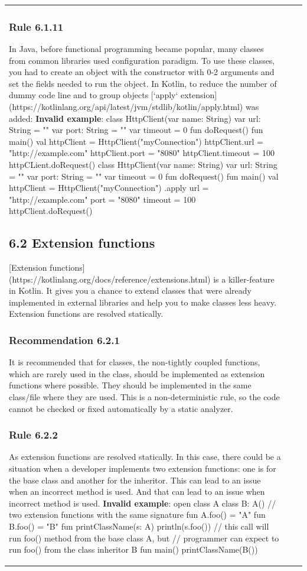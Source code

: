 \begin{center}
\begin{tabular}{ |p{}|p{}|p{}| }
{{{{{\subsubsection*{\textbf{Rule 6.1.11}}
In Java, before functional programming became popular, many classes from common libraries used configuration paradigm.
To use these classes, you had to create an object with the constructor with 0-2 arguments and set the fields needed to run the object.
In Kotlin, to reduce the number of dummy code line and to group objects [`apply` extension](https://kotlinlang.org/api/latest/jvm/stdlib/kotlin/apply.html) was added:
\textbf{Invalid example}:
class HttpClient(var name: String) {
    var url: String = ""
    var port: String = ""
    var timeout = 0
    fun doRequest() {}
}
fun main() {
    val httpClient = HttpClient("myConnection")
    httpClient.url = "http://example.com"
    httpClient.port = "8080"
    httpClient.timeout = 100
    httpCLient.doRequest()
}
class HttpClient(var name: String) {
    var url: String = ""
    var port: String = ""
    var timeout = 0
    fun doRequest() {}
}
fun main() {
    val httpClient = HttpClient("myConnection")
            .apply {
                url = "http://example.com"
                port = "8080"
                timeout = 100
            }
    httpClient.doRequest()
}
\subsection*{\textbf{6.2 Extension functions}}
[Extension functions](https://kotlinlang.org/docs/reference/extensions.html) is a killer-feature in Kotlin.
It gives you a chance to extend classes that were already implemented in external libraries and help you to make classes less heavy.
Extension functions are resolved statically.
\subsubsection*{\textbf{Recommendation 6.2.1}}
It is recommended that for classes, the non-tightly coupled functions, which are rarely used in the class, should be implemented as extension functions where possible.
They should be implemented in the same class/file where they are used. This is a non-deterministic rule, so the code cannot be checked or fixed automatically by a static analyzer.
\subsubsection*{\textbf{Rule 6.2.2}}
As extension functions are resolved statically. In this case, there could be a situation when a developer implements two extension functions: one is for the base class and another for the inheritor.
This can lead to an issue when an incorrect method is used.
And that can lead to an issue when incorrect method is used.
\textbf{Invalid example}:
open class A
class B: A()
// two extension functions with the same signature
fun A.foo() = "A"
fun B.foo() = "B"
fun printClassName(s: A) { println(s.foo()) }
// this call will run foo() method from the base class A, but
// programmer can expect to run foo() from the class inheritor B
fun main() { printClassName(B()) }
}}}}}
\end{tabular}
\end{center}
